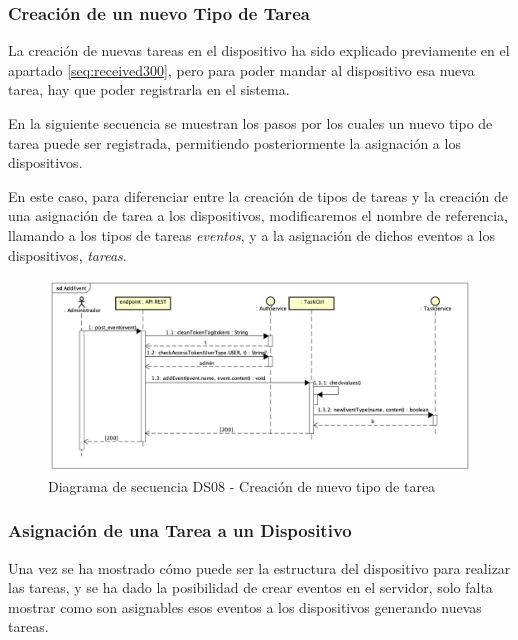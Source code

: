 \subsubsection{Creación de un nuevo Tipo de Tarea}

La creación de nuevas tareas en el dispositivo ha sido explicado previamente en el apartado \ref{seq:received300}, pero para poder mandar al dispositivo esa nueva tarea, hay que poder registrarla en el sistema.

En la siguiente secuencia se muestran los pasos por los cuales un nuevo tipo de tarea puede ser registrada, permitiendo posteriormente la asignación a los dispositivos.

En este caso, para diferenciar entre la creación de tipos de tareas y la creación de una asignación de tarea a los dispositivos, modificaremos el nombre de referencia, llamando a los tipos de tareas  \textit{eventos}, y a la asignación de dichos eventos a los dispositivos, \textit{tareas}.

\begin{figure}[H]
    \centering
    \includegraphics[width=14cm]{./img/sequence/diagram/AddEvent.png}
    \caption{Diagrama de secuencia DS08 - Creación de nuevo tipo de tarea}
    \label{fig:seq.NewEvent}
\end{figure}

\newpage
\subsubsection{Asignación de una Tarea a un Dispositivo}

Una vez se ha mostrado cómo puede ser la estructura del dispositivo para realizar las tareas, y se ha dado la posibilidad de crear eventos en el servidor, solo falta mostrar como son asignables esos eventos a los dispositivos generando nuevas tareas.


